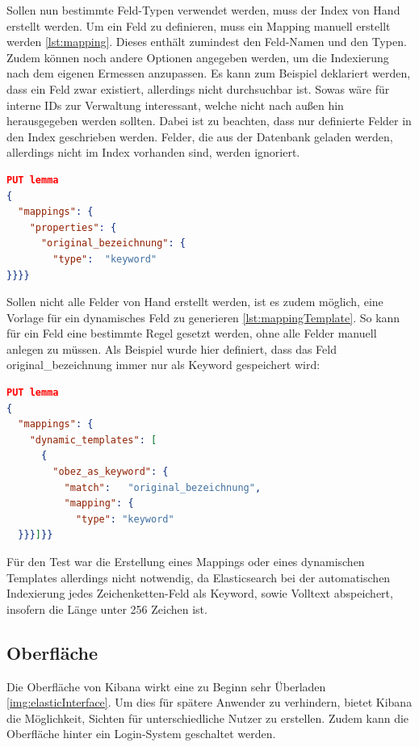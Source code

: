 Sollen nun bestimmte Feld-Typen verwendet werden, muss der Index von Hand erstellt werden. Um ein Feld zu definieren, muss ein Mapping manuell erstellt werden \ref{lst:mapping}. Dieses enthält zumindest den Feld-Namen und den Typen. Zudem können noch andere Optionen angegeben werden, um die Indexierung nach dem eigenen Ermessen anzupassen. Es kann zum Beispiel deklariert werden, dass ein Feld zwar existiert, allerdings nicht durchsuchbar ist. Sowas wäre für interne IDs zur Verwaltung interessant, welche nicht nach außen hin herausgegeben werden sollten. Dabei ist zu beachten, dass nur definierte Felder in den Index geschrieben werden. Felder, die aus der Datenbank geladen werden, allerdings nicht im Index vorhanden sind, werden ignoriert.

\begin{lstlisting}[language=JSON, frame=single, label={lst:mapping}, caption=Mapping für Elasticsearch Index,captionpos=b] 
PUT lemma
{
  "mappings": {
    "properties": {
      "original_bezeichnung": {
        "type":  "keyword"
}}}}
\end{lstlisting}

Sollen nicht alle Felder von Hand erstellt werden, ist es zudem möglich, eine Vorlage für ein dynamisches Feld zu generieren \ref{lst:mappingTemplate}. So kann für ein Feld eine bestimmte Regel gesetzt werden, ohne alle Felder manuell anlegen zu müssen. Als Beispiel wurde hier definiert, dass das Feld original\_bezeichnung immer nur als Keyword gespeichert wird:

\begin{lstlisting}[language=JSON, frame=single, label={lst:mappingTemplate}, caption=Dynamic-Mapping für Elasticsearch Index,captionpos=b] 
PUT lemma
{
  "mappings": {
    "dynamic_templates": [
      {
        "obez_as_keyword": {
          "match":   "original_bezeichnung",
          "mapping": {
            "type": "keyword"
  }}}]}}
\end{lstlisting}

Für den Test war die Erstellung eines Mappings oder eines dynamischen Templates allerdings nicht notwendig, da Elasticsearch bei der automatischen Indexierung jedes Zeichenketten-Feld als Keyword, sowie Volltext abspeichert, insofern die Länge unter 256 Zeichen ist.

\subsection{Oberfläche}

Die Oberfläche von Kibana wirkt eine zu Beginn  sehr Überladen \ref{img:elasticInterface}. Um dies für spätere Anwender zu verhindern, bietet Kibana die Möglichkeit, Sichten für unterschiedliche Nutzer zu erstellen. Zudem kann die Oberfläche hinter ein Login-System geschaltet werden.


